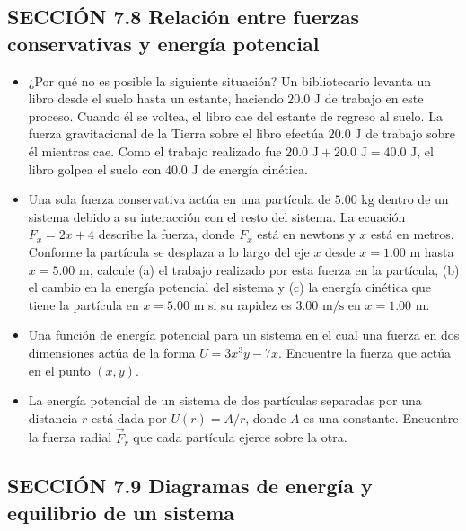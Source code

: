 \documentclass[11pt,a4paper]{article}
\begin{document}
\subsection*{SECCIÓN 7.8 Relación entre fuerzas conservativas y energía potencial}

\begin{itemize}
    \item[\textbf{34.}] ¿Por qué no es posible la siguiente situación? Un bibliotecario levanta un libro desde el suelo hasta un estante, haciendo $20.0 \text{ J}$ de trabajo en este proceso. Cuando él se voltea, el libro cae del estante de regreso al suelo. La fuerza gravitacional de la Tierra sobre el libro efectúa $20.0 \text{ J}$ de trabajo sobre él mientras cae. Como el trabajo realizado fue $20.0 \text{ J} + 20.0 \text{ J} = 40.0 \text{ J}$, el libro golpea el suelo con $40.0 \text{ J}$ de energía cinética.
    \vspace*{6cm}

    \item[\textbf{35.}] Una sola fuerza conservativa actúa en una partícula de $5.00 \text{ kg}$ dentro de un sistema debido a su interacción con el resto del sistema. La ecuación $F_x = 2x + 4$ describe la fuerza, donde $F_x$ está en newtons y $x$ está en metros. Conforme la partícula se desplaza a lo largo del eje $x$ desde $x = 1.00 \text{ m}$ hasta $x = 5.00 \text{ m}$, calcule (a) el trabajo realizado por esta fuerza en la partícula, (b) el cambio en la energía potencial del sistema y (c) la energía cinética que tiene la partícula en $x = 5.00 \text{ m}$ si su rapidez es $3.00 \text{ m/s}$ en $x = 1.00 \text{ m}$.
    \vspace*{6cm}

    \item[\textbf{36.}] Una función de energía potencial para un sistema en el cual una fuerza en dos dimensiones actúa de la forma $U = 3x^3y - 7x$. Encuentre la fuerza que actúa en el punto $(x, y)$.
    \vspace*{6cm}

    \item[\textbf{37.}] La energía potencial de un sistema de dos partículas separadas por una distancia $r$ está dada por $U(r) = A/r$, donde $A$ es una constante. Encuentre la fuerza radial $\vec{F}_r$ que cada partícula ejerce sobre la otra.
    \vspace*{6cm}
\end{itemize}

\newpage

\subsection*{SECCIÓN 7.9 Diagramas de energía y equilibrio de un sistema}
\end{document}
